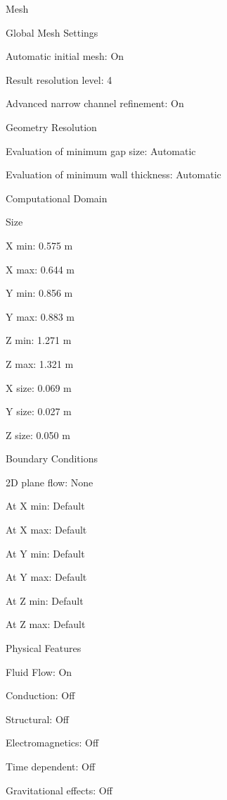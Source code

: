 Mesh 

    Global Mesh Settings 

                Automatic initial mesh:   On 

                Result resolution level:   4 

                Advanced narrow channel refinement:   On 

        Geometry Resolution 

                Evaluation of minimum gap size:   Automatic 

                Evaluation of minimum wall thickness:   Automatic 

    Computational Domain 

        Size 

                X min:   0.575 m 

                X max:   0.644 m 

                Y min:   0.856 m 

                Y max:   0.883 m 

                Z min:   1.271 m 

                Z max:   1.321 m 

                X size:   0.069 m 

                Y size:   0.027 m 

                Z size:   0.050 m 

        Boundary Conditions 

                2D plane flow:   None 

                At X min:   Default 

                At X max:   Default 

                At Y min:   Default 

                At Y max:   Default 

                At Z min:   Default 

                At Z max:   Default 

Physical Features 

                Fluid Flow:   On 

                Conduction:   Off 

                Structural:   Off 

                Electromagnetics:   Off 

                Time dependent:   Off 

                Gravitational effects:   Off 

